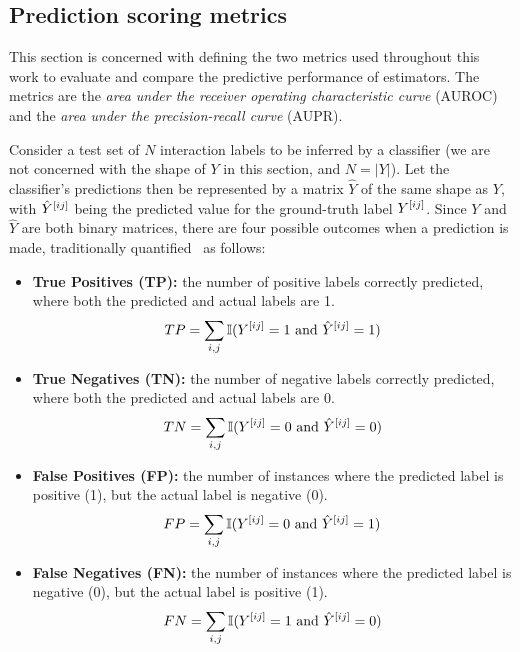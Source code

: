 \subsection{Prediction scoring metrics}
\label{sec:prediction_metrics}


This section is concerned with defining the two metrics used throughout this work to evaluate and compare the predictive performance of estimators. The metrics are the \emph{area under the receiver operating characteristic curve} (AUROC) and the \emph{area under the precision-recall curve} (AUPR).

Consider a test set of $N$ interaction labels to be inferred by a classifier (we are not concerned with the shape of $Y$ in this section, and $N=|Y|$). Let the classifier's predictions then be represented by a matrix $\hat Y$ of the same shape as $Y$, with $\hat Y^{[ij]}$ being the predicted value for the ground-truth label $Y^{[ij]}$. Since $Y$ and $\hat Y$ are both binary matrices, there are four possible outcomes when a prediction is made, traditionally quantified~\cite{powers2020evaluation} as follows:
%
\begin{itemize}
    \item \textbf{True Positives (TP):} the number of positive labels correctly predicted, where both the predicted and actual labels are 1.
    \begin{equation}
        TP = \sum_{i,j} \mathbb{I}(Y^{[ij]} = 1 \text{ and } \hat{Y}^{[ij]} = 1)
    \end{equation}

    \item \textbf{True Negatives (TN):} the number of negative labels correctly predicted, where both the predicted and actual labels are 0.
    \begin{equation}
        TN = \sum_{i,j} \mathbb{I}(Y^{[ij]} = 0 \text{ and } \hat{Y}^{[ij]} = 0)
    \end{equation}

    \item \textbf{False Positives (FP):} the number of instances where the predicted label is positive (1), but the actual label is negative (0).
    \begin{equation}
        FP = \sum_{i,j} \mathbb{I}(Y^{[ij]} = 0 \text{ and } \hat{Y}^{[ij]} = 1)
    \end{equation}

    \item \textbf{False Negatives (FN):} the number of instances where the predicted label is negative (0), but the actual label is positive (1).
    \begin{equation}
        FN = \sum_{i,j} \mathbb{I}(Y^{[ij]} = 1 \text{ and } \hat{Y}^{[ij]} = 0)
    \end{equation}
\end{itemize}
